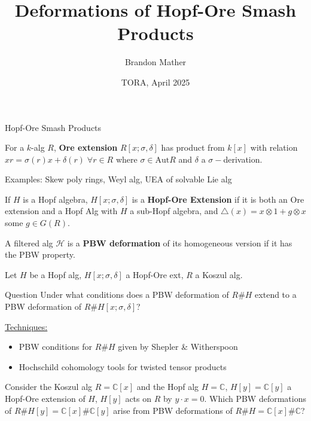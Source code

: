 \documentclass{beamer}
\title{Deformations of Hopf-Ore Smash Products}
\author{Brandon Mather}
\date{TORA, April 2025}
\begin{document}
\maketitle

\begin{frame}{Hopf-Ore Smash Products}
\begin{definition}
    For a \(k\)-alg \(R\), \textbf{Ore extension} \(R[x;\sigma,\delta]\) has product from \(k[x]\) with relation \(xr=\sigma(r)x+\delta(r)\;\forall r\in R\) where \(\sigma\in \text{Aut}R\) and \(\delta\) a \(\sigma-\)derivation. 
\end{definition}
Examples: Skew poly rings, Weyl alg, UEA of solvable Lie alg
\begin{definition}
    If \(H\) is a Hopf algebra, \(H[x;\sigma,\delta]\) is a \textbf{Hopf-Ore Extension} if it is both an Ore extension and a Hopf Alg with \(H\) a sub-Hopf algebra, and \(\triangle(x)=x\otimes 1+g\otimes x\) some \(g\in G(R)\).
\end{definition}
\begin{definition}
    A filtered alg \(\mathcal{H}\) is a \textbf{PBW deformation} of its homogeneous version if it has the PBW property.
\end{definition}
\end{frame}

\begin{frame} 
    Let \(H\) be a Hopf alg, \(H[x;\sigma,\delta]\) a Hopf-Ore ext, \(R\) a Koszul alg.
\begin{beamerboxesrounded}{Question}
    Under what conditions does a PBW deformation of \(R\#H\) extend to a PBW deformation of \(R\#H[x;\sigma,\delta]\)?
\end{beamerboxesrounded}

\underline{Techniques:}
\begin{itemize}
    \item PBW conditions for \(R\#H\) given by Shepler \& Witherspoon
    \item Hochschild cohomology tools for twisted tensor products
\end{itemize}
\begin{example}
    Consider the Koszul alg \(R=\mathbb{C}[x]\) and the Hopf alg \(H=\mathbb{C}\), \(H[y]=\mathbb{C}[y]\) a Hopf-Ore extension of \(H\), \(H[y]\) acts on \(R\) by \(y\cdot x=0\).
    Which PBW deformations of \(R\#H[y]=\mathbb{C}[x]\#\mathbb{C}[y]\) arise from PBW deformations of \(R\#H=\mathbb{C}[x]\#\mathbb{C}\)?
\end{example}
\end{frame}
\end{document}
